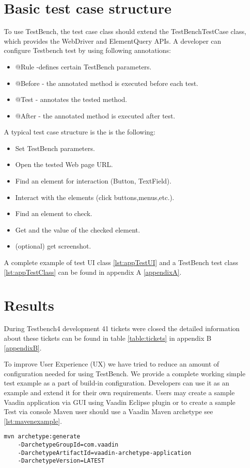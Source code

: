 \section {Basic test case structure}
To use TestBench, the test case class should extend the TestBenchTestCase class,
which provides the WebDriver and ElementQuery APIs. A developer
can configure Testbench test by using following annotations:
\begin{itemize}
  \item @Rule -defines certain TestBench parameters.
  \item @Before - the annotated method is executed before each test.
  \item @Test - annotates the tested method.
  \item @After - the annotated method is executed after test.
\end{itemize}

A typical test case structure is the is the following:
\begin{itemize}
  \item Set TestBench parameters.
  \item Open the tested Web page URL.
  \item Find an element for interaction (Button, TextField).
  \item Interact with the elements (click buttons,menus,etc.).
  \item Find an element to check.
  \item Get and the value of the checked element.
  \item (optional) get screenshot.
\end{itemize}

A complete example of test UI class \ref{lst:appTestUI}  and a TestBench test
class \ref{lst:appTestClass} can be found in appendix A \ref{appendixA}.

\section {Results}
During Testbench4 development 41 tickets were closed the detailed information
about these tickets can be found in table \ref{table:tickets} in
appendix B \ref{appendixB}. 

To improve User Experience (UX) we have tried to reduce an amount of
configuration needed for using TestBench. We provide a complete working simple
test example as a part of build-in configuration.
Developers can use it as an example and extend it for their own requirements. Users may create a sample
Vaadin application via GUI using Vaadin Eclipse plugin or 
to create a sample Test via console Maven user should use a Vaadin Maven
archetype see \ref{lst:mavenexample}.
\lstset{style=console}
\begin{lstlisting}[caption=Create Vaadin sample application command.,label={lst:mavenexample}]
mvn archetype:generate 
	-DarchetypeGroupId=com.vaadin
	-DarchetypeArtifactId=vaadin-archetype-application
	-DarchetypeVersion=LATEST
\end{lstlisting}

